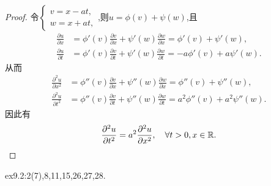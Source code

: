 \begin{proof}
    令$\begin{cases}
        v = x - at, \\
        w = x + at,
    \end{cases}$,则$u = \phi(v) + \psi(w)$,且
    \begin{align*}
        \frac{\partial u}{\partial x} & = \phi'(v) \frac{\partial v}{\partial x} + \psi'(w) \frac{\partial w}{\partial x} = \phi'(v) + \psi'(w), \\
        \frac{\partial u}{\partial t} & = \phi'(v) \frac{\partial v}{\partial t} + \psi'(w) \frac{\partial w}{\partial t} = -a \phi'(v) + a \psi'(w).
    \end{align*}
    从而
    \begin{align*}
        \frac{\partial^2 u}{\partial x^2} & = \phi''(v) \frac{\partial v}{\partial x} + \psi''(w) \frac{\partial w}{\partial x} = \phi''(v) + \psi''(w), \\
        \frac{\partial^2 u}{\partial t^2} & = \phi''(v) \frac{\partial v}{\partial t} + \psi''(w) \frac{\partial w}{\partial t} = a^2 \phi''(v) + a^2 \psi''(w).
    \end{align*}
    因此有
    $$
    \frac{\partial^2 u}{\partial t^2} = a^2 \frac{\partial^2 u}{\partial x^2}, \quad \forall t >0, x \in \mathbb{R}.
    $$
\end{proof}

\begin{homework}
ex9.2:2(7),8,11,15,26,27,28.
\end{homework}